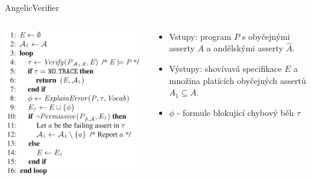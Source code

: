 \documentclass[11pt]{beamer}
\begin{document}

\begin{frame}{AngelicVerifier}
\begin{columns}

\begin{column}{0.5\textwidth}
\pause \includegraphics[width=0.9\linewidth]{img/angelicVerifyShort.png}
\end{column}

\begin{column}{0.5\textwidth}
\begin{itemize}
\pause \item Vstupy: program $P$ s obyčejnými asserty $A$ a andělskými asserty $\hat{A}$.
\pause \item Výstupy: shovívavá specifikace $E$ a množina platících obyčejných assertů $A_1 \subseteq A$.
\pause \item $\phi$ - formule blokující chybový běh $\tau$
\end{itemize}
\end{column}

\end{columns}
\end{frame}
\end{document}
